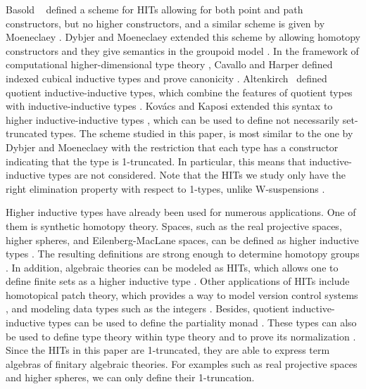 Basold \etal \ \cite{BasoldGW17} defined a scheme for HITs allowing for both point and path constructors,
but no higher constructors, and a similar scheme is given by
Moeneclaey \cite{moeneclaey2016schema}. 
Dybjer and Moeneclaey extended this scheme by allowing homotopy constructors and
they give semantics in the groupoid model \cite{DBLP:journals/entcs/DybjerM18}.
In the framework of computational higher-dimensional type theory \cite{AngiuliHW17},
Cavallo and Harper defined indexed cubical inductive types and prove canonicity \cite{CavalloH19}.
Altenkirch \etal \ defined quotient inductive-inductive types, which combine the features
of quotient types with inductive-inductive types \cite{forsberg2010inductive,AltenkirchCDKF18}.
Kov\'acs and Kaposi extended this syntax to higher inductive-inductive types \cite{KaposiK18},
which can be used to define not necessarily set-truncated types.
The scheme studied in this paper, is most similar to the one by Dybjer and Moeneclaey \cite{DBLP:journals/entcs/DybjerM18}
with the restriction that each type has a constructor indicating that the type is 1-truncated.
In particular, this means that inductive-inductive types are not considered.
Note that the HITs we study only have the right elimination property with respect to 1-types,
unlike W-suspensions \cite{Sojakova15,sojakovaPhD}.

Higher inductive types have already been used for numerous applications.
One of them is synthetic homotopy theory.
Spaces, such as the real projective spaces, higher spheres, and Eilenberg-MacLane spaces,
can be defined as higher inductive types \cite{licata2013pi,LicataF14,DBLP:conf/lics/BuchholtzR17,hottbook}.
The resulting definitions are strong enough to determine homotopy groups
\cite{licata2013pi,LicataS13}.
In addition, algebraic theories can be modeled as HITs, which allows one
to define finite sets as a higher inductive type \cite{frumin2018finite}.
Other applications of HITs include homotopical patch theory, which provides a way
to model version control systems \cite{AngiuliMLH16}, and modeling data types
such as the integers \cite{BasoldGW17,altenkirchscoccola}.
Besides, quotient inductive-inductive types can be used to define the partiality monad \cite{AltenkirchDK17}.
These types can also be used to define type theory within type theory \cite{AltenkirchK16}
and to prove its normalization \cite{DBLP:journals/lmcs/AltenkirchK17}.
Since the HITs in this paper are 1-truncated, they are able to express term algebras of finitary algebraic theories.
For examples such as real projective spaces and higher spheres, we can only define their 1-truncation.

